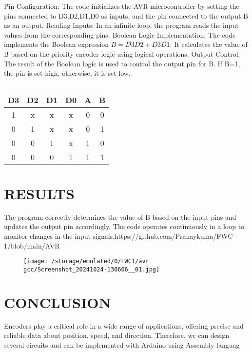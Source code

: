 \documentclass[conference]{IEEEtran}
\begin{document}
Pin Configuration: The code initializes the AVR microcontroller by setting the pins connected to D3,D2,D1,D0 as inputs, and the pin connected to the output B as an output.
Reading Inputs: In an infinite loop, the program reads the input values from the corresponding pins.
Boolean Logic Implementation: The code implements the Boolean expression 
$B={\bar{D3}}D2+{\bar{D3}} {\bar{D1}}$. It calculates the value of B based on the priority encoder logic using logical operations.
Output Control: The result of the Boolean logic is used to control the output pin for B. If B=1, the pin is set high, otherwise, it is set low.
\begin{table} [htbp]
\centering
\begin{tabular}{| c | c | c | c | c | c |} \hline
D3& D2& D1& D0& A & B  \\\hline
1 & x & x & x & 0 & 0\\ \hline
0 & 1 & x & x & 0 & 1\\ \hline
0 & 0 & 1 & x & 1 & 0\\ \hline
0 & 0 & 0 & 1 & 1 & 1 \\ \hline

\end{tabular}
\vspace{0.2cm}
\caption{\label{tab:widgets}}
\end{table}

\section{RESULTS}
The program correctly determines the value of B based on the input pins and updates the output pin accordingly. The code operates continuously in a loop to monitor changes in the input signals.https://github.com/Pranaykuma/FWC-1/blob/main/AVR%
\begin{figure}[h] 
	\centering 
	\texttt{[image: /storage/emulated/0/FWC1/avr gcc/Screenshot\_20241024-130606\_\_01.jpg]}
	\caption{\label{fig:Gates}}    
\end{figure}
\section{CONCLUSION}
Encoders play a critical role in a wide range of applications,
offering precise and reliable data about position, speed, and
direction. Therefore, we can design several circuits and can
be implemented with Arduino using Assembly languag
\end{document}

